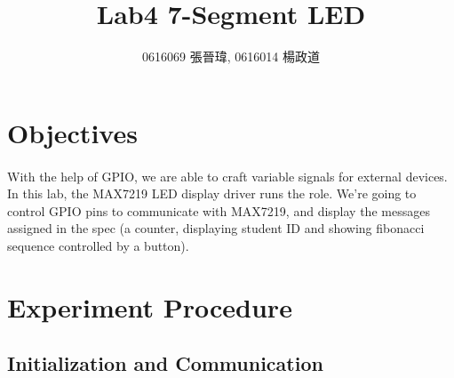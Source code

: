 \title{Lab4 7-Segment LED}
\author{0616069 張晉瑋, 0616014 楊政道}
\maketitle
\thispagestyle{fancy}
\section{Objectives}
\paragraph{}
With the help of GPIO, we are able to craft variable signals for external devices.
In this lab, the MAX7219 LED display driver runs the role.
We're going to control GPIO pins to communicate with MAX7219, and display the messages assigned in the spec
(a counter, displaying student ID and showing fibonacci sequence controlled by a button).

\section{Experiment Procedure}
\subsection{Initialization and Communication}
